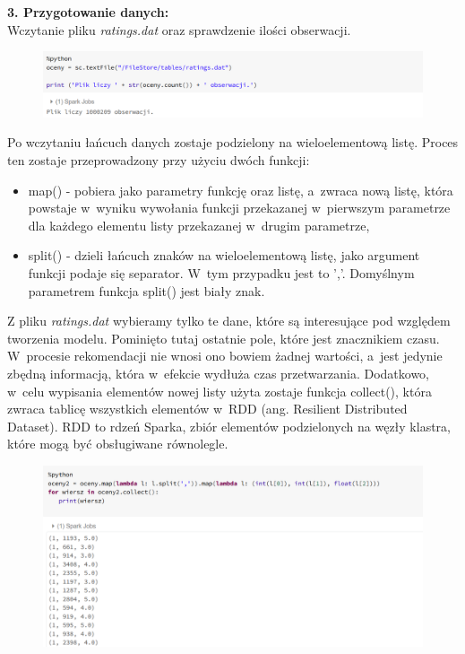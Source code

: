 \documentclass[12pt,a4paper]{report}
\begin{document}
\textbf{3. Przygotowanie danych:}
\\Wczytanie pliku \textit{ratings.dat} oraz sprawdzenie ilości obserwacji.

\begin{figure}[H]
\includegraphics[scale=0.5]{obrazy/ALS2.PNG} 
\end{figure}


Po wczytaniu łańcuch danych zostaje podzielony na wieloelementową listę. Proces ten zostaje przeprowadzony przy użyciu dwóch funkcji:
\begin{itemize}
\item map() - pobiera jako parametry funkcję oraz listę, a~zwraca nową listę, która powstaje w~wyniku wywołania funkcji przekazanej w~pierwszym parametrze dla każdego elementu listy przekazanej w~drugim parametrze,
\item split() - dzieli łańcuch znaków na wieloelementową listę, jako argument funkcji podaje się separator. W~tym przypadku jest to ','. Domyślnym parametrem funkcja split() jest biały znak.
\end{itemize}
Z pliku \textit{ratings.dat} wybieramy tylko te dane, które są interesujące pod względem tworzenia modelu. Pominięto tutaj ostatnie pole, które jest znacznikiem czasu. W~procesie rekomendacji nie wnosi ono bowiem żadnej wartości, a~jest jedynie zbędną informacją, która w~efekcie wydłuża czas przetwarzania.
Dodatkowo, w~celu wypisania elementów nowej listy użyta zostaje funkcja collect(), która zwraca tablicę wszystkich elementów w~RDD (ang. Resilient Distributed Dataset). RDD to rdzeń Sparka,  zbiór elementów podzielonych na węzły klastra, które mogą być obsługiwane równolegle.

\begin{figure}[H]
\includegraphics[scale=0.5]{obrazy/ALS3.PNG} 
\end{figure}
\end{document}

